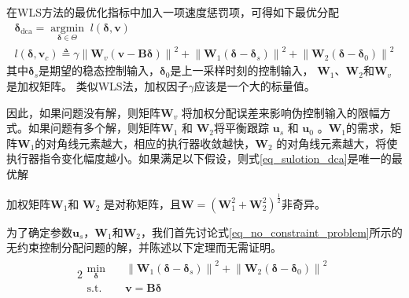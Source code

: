 在WLS方法的最优化指标中加入一项速度惩罚项，可得如下最优分配
\begin{gather}
{\bm{\delta}_{{\text{dca}}}} = \mathop {{\text{argmin}}}\limits_{\bm{\delta} \in \Theta }\; l\left( {\bm{\delta},\bm{v}} \right) \label{eq_sulotion_dca}	\\
l\left( {\bm{\delta},{\bm{v}_{{c}}}} \right) \triangleq 
\gamma {\left\| {{\bm{W}_{{v}}}\left( {\bm{v} - \bm{B\delta}} \right)} \right\|^2} + 
{\left\| {{\bm{W}_1}\left( {\bm{\delta} - {\bm{\delta}_{{s}}}} \right)} \right\|^2} + 
{\left\| {{\bm{W}_2}\left( {\bm{\delta} - {\bm{\delta}_{{0}}}} \right)} \right\|^2} \label{29}
\end{gather}
其中${{\bm{\delta}}_{ {s}}}$是期望的稳态控制输入，${{\bm{\delta}}_{0}}$是上一采样时刻的控制输入， ${{\bm{W}}_{1}}$、${{\bm{W}}_{2}}$和${{\bm{W}}_{ {v}}}$ 是加权矩阵。 类似WLS法，加权因子$ \gamma $应该是一个大的标量值。

因此，如果问题没有解，则矩阵${{\bm{W}}_{ {v}}}$ 将加权分配误差来影响伪控制输入的限幅方式。如果问题有多个解，则矩阵${{\bm{W}}_{1}}$ 和 ${{\bm{W}}_{2}}$将平衡跟踪 ${{\bm{u}}_{ {s}}}$ 和 ${{\bm{u}}_{0}}$ 。${{\bm{W}}_{1}}$的需求，矩阵${{\bm{W}}_{1}}$的对角线元素越大，相应的执行器收敛越快，${{\bm{W}}_{2}}$ 的对角线元素越大，将使执行器指令变化幅度越小。如果满足以下假设，则式\eqref {eq_sulotion_dca}是唯一的最优解\cite{Harkegaard_2004}
\begin{assumption}
加权矩阵${{\bm{W}}_{1}}$和 ${{\bm{W}}_{2}}$ 是对称矩阵，且$\bm{W} = {\left( {\bm{W}_1^2 + \bm{W}_2^2} \right)^{\frac{1}{2}}}$非奇异。	\label{assum_dca1}
\end{assumption}

为了确定参数${{\bm{u}}_{ {s}}}$，$\bm{W}_1$和$\bm{W}_2$，我们首先讨论式\eqref{eq_no_constraint_problem}所示的无约束控制分配问题的解，并陈述以下定理而无需证明\cite{Harkegaard_2004}。
\begin{alignat}{2}
\begin{split}
\mathop {{\text{min}}}\limits_{\bm{\delta} }\quad& {\left\| {{\bm{W}_1}\left( {\bm{\delta} - {\bm{\delta}_{{s}}}} \right)} \right\|^2} + 
{\left\| {{\bm{W}_2}\left( {\bm{\delta} - {\bm{\delta}_{{0}}}} \right)} \right\|^2}\\
\mbox{s.t.}\quad
&\bm{v }=\bm{B}\bm{\delta} 
\end{split} \label{eq_no_constraint_problem}
\end{alignat}

